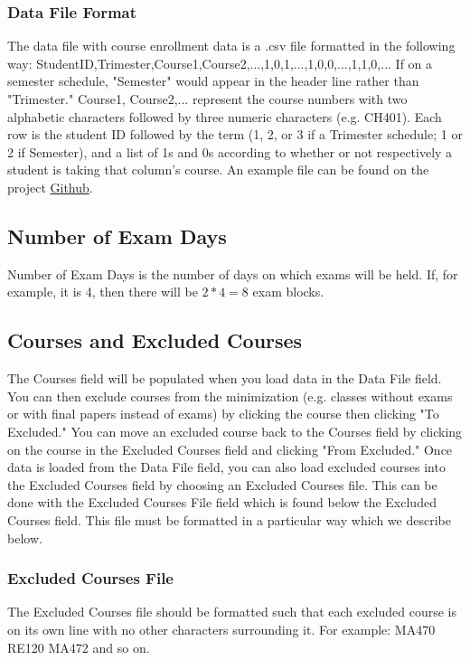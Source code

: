 \documentclass[12pt]{article}
\begin{document}
\subsubsection{Data File Format}
The data file with course enrollment data is a .csv file formatted in the following way:\newline\newline
StudentID,Trimester,Course1,Course2,...,1,0,1,...,1,0,0,...,1,1,0,...\newline
\newline
\noindent If on a semester schedule, "Semester" would appear in the header line rather than "Trimester." Course1, Course2,... represent the course numbers with two alphabetic characters followed by three numeric characters (e.g. CH401). Each row is the student ID followed by the term (1, 2, or 3 if a Trimester schedule; 1 or 2 if Semester), and a list of 1s and 0s according to whether or not respectively a student is taking that column's course. An example file can be found on the project \href{https://github.com/maxhirsch/ssmes}{Github}.
\subsection{Number of Exam Days}
Number of Exam Days is the number of days on which exams will be held. If, for example, it is 4, then there will be $2*4=8$ exam blocks.
\subsection{Courses and Excluded Courses}
\label{sec:excludedcourses}
The Courses field will be populated when you load data in the Data File field. You can then exclude courses from the minimization (e.g. classes without exams or with final papers instead of exams) by clicking the course then clicking "To Excluded." You can move an excluded course back to the Courses field by clicking on the course in the Excluded Courses field and clicking "From Excluded." Once data is loaded from the Data File field, you can also load excluded courses into the Excluded Courses field by choosing an Excluded Courses file. This can be done with the Excluded Courses File field which is found below the Excluded Courses field. This file must be formatted in a particular way which we describe below.
\subsubsection{Excluded Courses File}
The Excluded Courses file should be formatted such that each excluded course is on its own line with no other characters surrounding it. For example:\newline\newline
MA470\newline
RE120\newline
MA472\newline
\newline
and so on.
\end{document}
